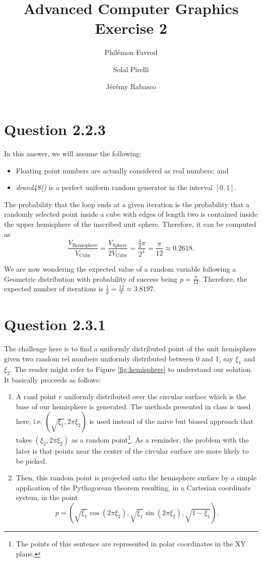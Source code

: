 \documentclass{article}
\title{Advanced Computer Graphics\\Exercise 2}
\author{Phil\'emon Favrod \and Solal Pirelli \and J\'er\'emy Rabasco}
\begin{document}
\maketitle

\section*{Question 2.2.3}
In this answer, we will assume the following:
\begin{itemize}
\item Floating point numbers are actually considered as real numbers; and
\item \textit{drand48()} is a perfect uniform random generator in the interval $[0, 1]$.
\end{itemize}
The probability that the loop ends at a given iteration is the probability that a randomly selected point inside a cube with edges of length two is contained inside the upper hemisphere of the inscribed unit sphere. Therefore, it can be computed as
$$
\frac{V_{\text{Hemisphere}}}{V_{\text{Cube}}} = \frac{V_{\text{Sphere}}}{2V_{\text{Cube}}} = \frac{\frac{4}{3}\pi}{2^4} = \frac{\pi}{12} \approx 0.2618. 
$$

We are now wondering the expected value of a random variable following a Geometric distribution with probability of success being $p = \frac{\pi}{12}$. Therefore,
the expected number of iterations is $\frac 1p = \frac{12}{\pi} \approx 3.8197$.

\section*{Question 2.3.1}
The challenge here is to find a uniformly distributed point of the unit hemisphere given two random rel numbers uniformly distributed between 0 and 1, say $\xi_1$ and $\xi_2$. The reader might refer to Figure \ref{fig:hemisphere} to understand our solution. It basically proceeds as follows:
\begin{enumerate}[1.]
\item A rand point $r$ uniformly distributed over the circular surface which is the base of our hemisphere is generated. The methods presented in class is used here, i.e. $(\sqrt{\xi_1}, 2\pi\xi_2)$ is used instead of the naive but biased approach that takes $(\xi_2, 2\pi\xi_2)$ as a random point\footnote{The points of this sentence are represented in polar coordinates in the XY plane.}. As a reminder, the problem with the later is that points near the center of the circular surface are more likely to be picked. 
\item Then, this random point is projected onto the hemisphere surface by a simple application of the Pythagorean theorem resulting, in a Cartesian coordinate system, in the point
$$
p = (\sqrt{\xi_1}\cos{\left( 2\pi\xi_2\right)}, \sqrt{\xi_1}\sin{\left( 2\pi\xi_2\right)}, \sqrt{1 - \xi_1}).
$$
\end{enumerate}
\end{document}
